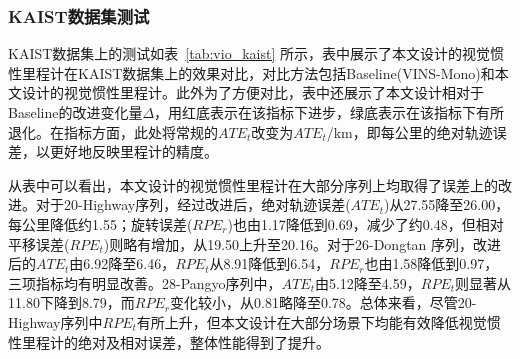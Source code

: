 \subsubsection{KAIST数据集测试}

KAIST数据集上的测试如表~\ref{tab:vio_kaist} 所示，表中展示了本文设计的视觉惯性里程计在KAIST数据集上的效果对比，对比方法包括Baseline(VINS-Mono)和本文设计的视觉惯性里程计。此外为了方便对比，表中还展示了本文设计相对于Baseline的改进变化量$\Delta$，用红底表示在该指标下进步，绿底表示在该指标下有所退化。在指标方面，此处将常规的$ATE_t$改变为$ATE_t$/km，即每公里的绝对轨迹误差，以更好地反映里程计的精度。

从表中可以看出，本文设计的视觉惯性里程计在大部分序列上均取得了误差上的改进。对于20-Highway序列，经过改进后，绝对轨迹误差($ATE_t$)从27.55降至26.00，每公里降低约1.55；旋转误差($RPE_r$)也由1.17降低到0.69，减少了约0.48，但相对平移误差($RPE_t$)则略有增加，从19.50上升至20.16。对于26-Dongtan 序列，改进后的$ATE_t$由6.92降至6.46，$RPE_t$从8.91降低到6.54，$RPE_r$也由1.58降低到0.97，三项指标均有明显改善。28-Pangyo序列中，$ATE_t$由5.12降至4.59，$RPE_t$则显著从11.80下降到8.79，而$RPE_r$变化较小，从0.81略降至0.78。总体来看，尽管20-Highway序列中$RPE_t$有所上升，但本文设计在大部分场景下均能有效降低视觉惯性里程计的绝对及相对误差，整体性能得到了提升。

